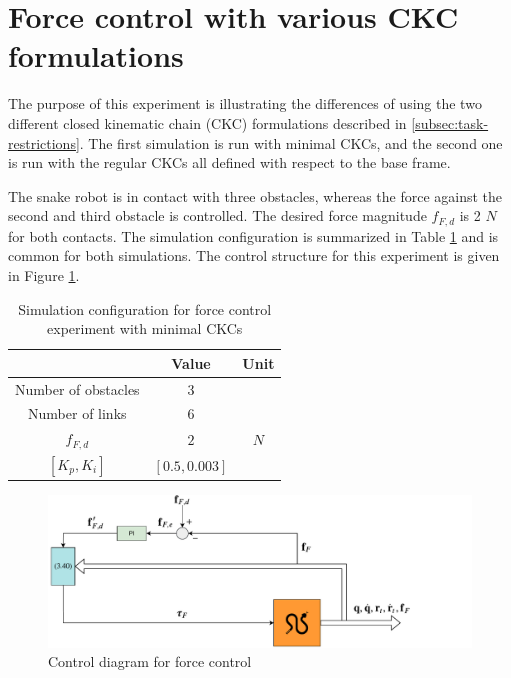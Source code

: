 \section{Force control with various CKC formulations}\label{sec:2xminiJforce}

The purpose of this experiment is illustrating the differences of using the two different closed kinematic chain (CKC) formulations described in \ref{subsec:task-restrictions}. The first simulation is run with minimal CKCs, and the second one is run with the regular CKCs all defined with respect to the base frame.

The snake robot is in contact with three obstacles, whereas the force against the second and third obstacle is controlled. The desired force magnitude $f_{F,d}$ is 2 $N$ for both contacts. The simulation configuration is summarized in Table \ref{tab:exp_2xf} and is common for both simulations. The control structure for this experiment is given in Figure \ref{fig:diag-f}.

\begin{table}[]
    \centering
    \begin{tabular}{|c|c|c|}
        \hline
        & Value & Unit\\
        \hline
        Number of obstacles & $3$ & \\
        Number of links & $6$ & \\
        $f_{F,d}$ & $2$ & $N$ \\
        $[K_{p}, K_{i}]$ & $[0.5, 0.003]$ &\\
        \hline
    \end{tabular}
    \caption{Simulation configuration for force control experiment with minimal CKCs}
    \label{tab:exp_2xf}
\end{table}

\begin{figure}
    \centering
    \includegraphics[trim=0cm 0cm 3cm 0cm, clip=true, width=\textwidth]{figures/experiments/control-diagrams/2f-control-diagram.pdf}
    \caption{Control diagram for force control}
    \label{fig:diag-f}
\end{figure}

